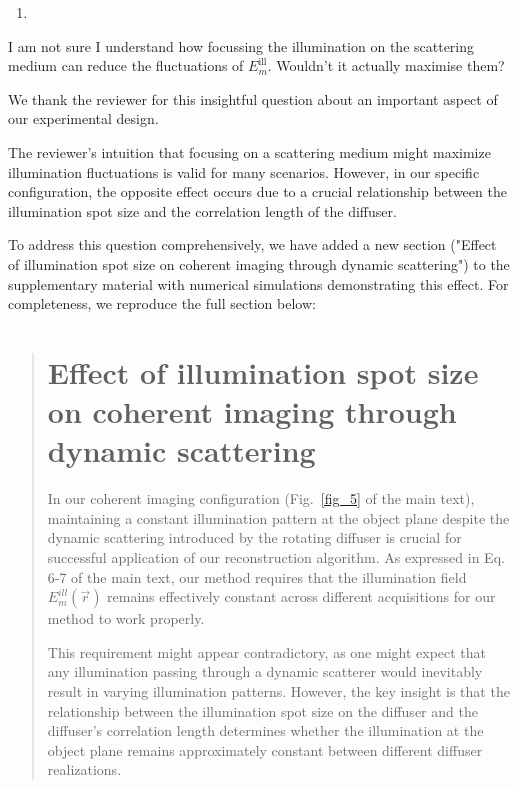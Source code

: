 \documentclass[12pt]{article}
\newenvironment{solved_reviewercomment}
    {\begin{tcolorbox}[width=\linewidth,colback=gray!5,colframe=solved_commentcolor!50,title=Reviewer Comment,left=5pt,right=5pt]}
    {\end{tcolorbox}}
\newenvironment{ourresponse}
    {\begin{tcolorbox}[width=\linewidth,breakable,enhanced,colback=gray!5,colframe=responsecolor!50,title=Response,left=5pt,right=5pt]}
    {\end{tcolorbox}}
\begin{document}
        
\begin{enumerate}[label=\arabic*., resume]
\item \leavevmode
\end{enumerate}
\vspace{-1em}
\begin{solved_reviewercomment}
    I am not sure I understand how focussing the illumination on the scattering medium can reduce the fluctuations of \(E^{\text{ill}}_m\). Wouldn't it actually maximise them?    
\end{solved_reviewercomment}
\begin{ourresponse}
We thank the reviewer for this insightful question about an important aspect of our experimental design.

The reviewer's intuition that focusing on a scattering medium might maximize illumination fluctuations is valid for many scenarios. However, in our specific configuration, the opposite effect occurs due to a crucial relationship between the illumination spot size and the correlation length of the diffuser.

To address this question comprehensively, we have added a new section ("Effect of illumination spot size on coherent imaging through dynamic scattering") to the supplementary material with numerical simulations demonstrating this effect. For completeness, we reproduce the full section below:
\begin{quote}
    \section*{Effect of illumination spot size on coherent imaging through dynamic scattering}

In our coherent imaging configuration (Fig.~\ref{fig_5} of the main text), maintaining a constant illumination pattern at the object plane despite the dynamic scattering introduced by the rotating diffuser is crucial for successful application of our reconstruction algorithm. As expressed in Eq. 6-7 of the main text, our method requires that the illumination field $E_m^{ill}(\vec{r})$ remains effectively constant across different acquisitions for our method to work properly.

This requirement might appear contradictory, as one might expect that any illumination passing through a dynamic scatterer would inevitably result in varying illumination patterns. However, the key insight is that the relationship between the illumination spot size on the diffuser and the diffuser's correlation length determines whether the illumination at the object plane remains approximately constant between different diffuser realizations.



\end{quote}
\end{ourresponse}
\end{document}
